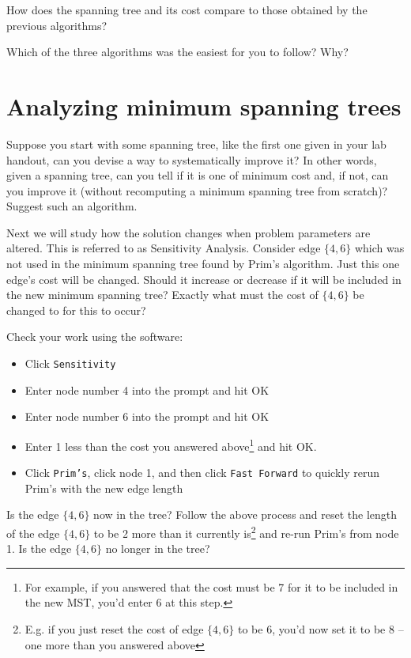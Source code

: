 \documentclass[fullpage,fleqn,leqno]{article}
\begin{document}
\vspace*{3\baselineskip}

How does the spanning tree
and its cost compare to those obtained by the previous algorithms?

\vspace*{3\baselineskip}

Which of the three algorithms was the easiest for you to follow? Why?

\vspace*{3\baselineskip}

\section{Analyzing minimum spanning trees}

Suppose you start with some spanning tree, like the first one given in
your lab handout, can you devise a way to systematically improve it? In
other words, given a spanning tree, can you tell if it is one of
minimum cost and, if not, can you improve it (without recomputing a
minimum spanning tree from scratch)? Suggest such an algorithm.


\vspace*{6\baselineskip}


Next we will study how the solution changes when problem parameters
are altered. This is referred to as Sensitivity Analysis. Consider
edge $\{4, 6\}$ which was not used in the minimum spanning tree found
by Prim's algorithm. Just this one edge's cost will be changed. Should
it increase or decrease if it will be included in the new minimum
spanning tree? Exactly what must the cost of $\{4, 6\}$ be changed to
for this to occur?  

\vspace*{6\baselineskip}

Check your work using the software: 
\begin{itemize}
\item Click \texttt{Sensitivity}
\item Enter node number 4 into the prompt and hit OK
\item Enter node number 6 into the prompt and hit OK
\item Enter 1  less than the cost you answered above\footnote{For example, if you answered that the cost must be 7 for it to be included in the new MST, you'd enter 6 at this step.} and hit OK.
\item Click \texttt{Prim's}, click node 1, and then click \texttt{Fast Forward} to quickly rerun Prim's with the new edge length
\end{itemize}
Is the edge $\{4, 6\}$ now in the tree?  Follow the above process and reset the length of the edge $\{4, 6\}$ to be 2 more than it currently is\footnote{E.g. if you just reset the cost of edge $\{4, 6\}$ to be 6, you'd now set it to be 8 -- one more than you answered above} and re-run Prim's from node 1.  Is the edge $\{4, 6\}$ no longer in the tree?
\end{document}
